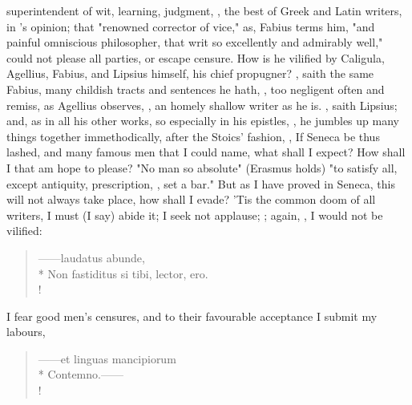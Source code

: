superintendent of wit, learning, judgment, , the best of Greek and Latin writers, in 's opinion;
that "renowned corrector of vice," as, Fabius terms him,
"and painful omniscious philosopher, that writ so excellently and admirably
well," could not please all parties, or escape censure. How is he vilified by
Caligula, Agellius, Fabius, and Lipsius himself, his chief
propugner? , saith the same Fabius, many childish
tracts and sentences he hath, , too negligent often and
remiss, as Agellius observes, , an homely shallow writer as he is.
, saith Lipsius;
and, as in all his other works, so especially in his epistles, , he jumbles up many things together immethodically,
after the Stoics' fashion, , \etc{} If
Seneca be thus lashed, and many famous men that I could name, what shall I
expect? How shall I that am  hope to please? "No
man so absolute" (Erasmus holds) "to satisfy all, except
antiquity, prescription, \etc{}, set a bar." But as I have proved in Seneca,
this will not always take place, how shall I evade? 'Tis the common doom of all
writers, I must (I say) abide it; I seek not applause;
; again, , I would not be vilified:

\begin{latin}
\begin{verse}%
------laudatus abunde,\\*
Non fastiditus si tibi, lector, ero.\\!
\end{verse}%
\end{latin}

I fear good men's censures, and to their favourable acceptance I submit my labours,

\begin{latin}
\begin{verse}%
------et linguas mancipiorum\\*
Contemno.------\\!
\end{verse}%
\end{latin}

